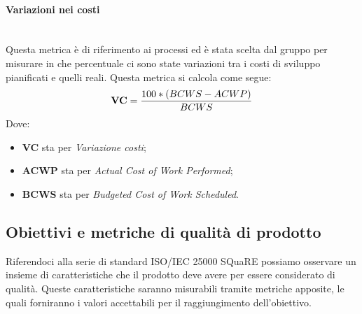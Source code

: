\paragraph{Variazioni nei costi}\mbox{}\\
Questa metrica è di riferimento ai processi ed è stata scelta dal gruppo per misurare in che percentuale ci sono state variazioni tra i costi di sviluppo pianificati e quelli reali. Questa metrica si calcola come segue:
\begin{align*}
	\centering
	\textbf{VC} = \frac{100 * (BCWS - ACWP)}{BCWS}
\end{align*}
Dove:
\begin{itemize}
	\item \textbf{VC} sta per \textit{Variazione costi};
	\item \textbf{ACWP} sta per \textit{Actual Cost of Work Performed};
	\item \textbf{BCWS} sta per \textit{Budgeted Cost of Work Scheduled}.
\end{itemize}
\newpage
\subsection{Obiettivi e metriche di qualità di prodotto}
Riferendoci alla serie di standard ISO/IEC 25000 SQuaRE possiamo osservare un insieme di caratteristiche che il prodotto deve avere per essere considerato di qualità. Queste caratteristiche saranno misurabili tramite metriche apposite, le quali forniranno i valori accettabili per il raggiungimento dell'obiettivo.
